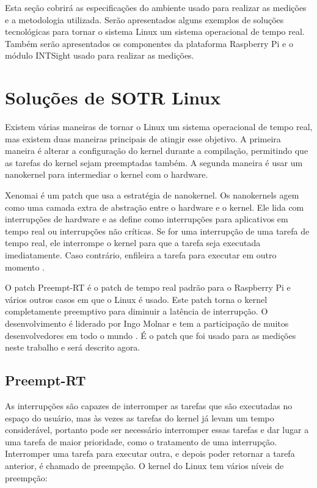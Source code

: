 \label{cap3}

Esta seção cobrirá as especificações do ambiente usado para realizar as medições e a metodologia utilizada. Serão apresentados alguns exemplos de soluções tecnológicas para tornar o sistema Linux um sistema operacional de tempo real. Também serão apresentados os componentes da plataforma Raspberry Pi e o módulo INTSight usado para realizar as medições.

\section{Soluções de SOTR Linux}

Existem várias maneiras de tornar o Linux um sistema operacional de tempo real, mas existem duas maneiras principais de atingir esse objetivo. A primeira maneira é alterar a configuração do kernel durante a compilação, permitindo que as tarefas do kernel sejam preemptadas também. A segunda maneira é usar um nanokernel para intermediar o kernel com o hardware.

Xenomai é um patch que usa a estratégia de nanokernel. Os nanokernels agem como uma camada extra de abstração entre o hardware e o kernel. Ele lida com interrupções de hardware e as define como interrupções para aplicativos em tempo real ou interrupções não críticas. Se for uma interrupção de uma tarefa de tempo real, ele interrompe o kernel para que a tarefa seja executada imediatamente. Caso contrário, enfileira a tarefa para executar em outro momento \cite{Xenomai2005}.

O patch Preempt-RT é o patch de tempo real padrão para o Raspberry Pi e vários outros casos em que o Linux é usado. Este patch torna o kernel completamente preemptivo para diminuir a latência de interrupção. O desenvolvimento é liderado por Ingo Molnar e tem a participação de muitos desenvolvedores em todo o mundo \cite{McKenney2005, Molnar2016}. É o patch que foi usado para as medições neste trabalho e será descrito agora.

\subsection{Preempt-RT}\label{Preempt-RT}

As interrupções são capazes de interromper as tarefas que são executadas no espaço do usuário, mas às vezes as tarefas do kernel já levam um tempo considerável, portanto pode ser necessário interromper essas tarefas e dar lugar a uma tarefa de maior prioridade, como o tratamento de uma interrupção. Interromper uma tarefa para executar outra, e depois poder retornar a tarefa anterior, é chamado de preempção. O kernel do Linux tem vários níveis de preempção:

